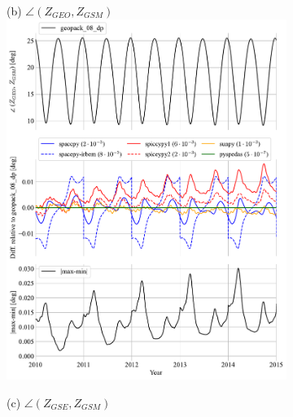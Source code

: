 \documentclass[draft]{agujournal2019}
\begin{document}
\begin{figure}[htb]
\begin{subfigure}[b]{0.49\textwidth}
     \end{subfigure}
     \begin{subfigure}[b]{0.49\textwidth}
         (b) $\angle (Z_{GEO}, Z_{GSM})$
         \centering
         \includegraphics[width=\textwidth]{code/figures/angles/z-delta=1days_20100101-20150101/GEO_GSM.pdf}
     \end{subfigure}
     \par\bigskip\bigskip
     \begin{subfigure}[b]{0.49\textwidth}
         (c) $\angle (Z_{GSE}, Z_{GSM})$
         \centering

\end{subfigure}
\end{figure}
\end{document}
